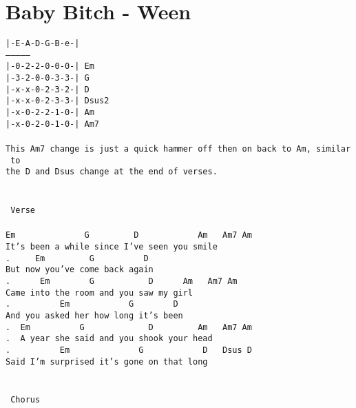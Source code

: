 \newpage
\section{Baby Bitch - Ween}
\label{Baby Bitch - Ween}
\texttt{|-E-A-D-G-B-e-|\\
---------------\\
|-0-2-2-0-0-0-|\ Em\\
|-3-2-0-0-3-3-|\ G\\
|-x-x-0-2-3-2-|\ D\\
|-x-x-0-2-3-3-|\ Dsus2\\
|-x-0-2-2-1-0-|\ Am\\
|-x-0-2-0-1-0-|\ Am7\\
\\
This\ Am7\ change\ is\ just\ a\ quick\ hammer\ off\ then\ on\ back\ to\ Am,\ similar\ to\\
the\ D\ and\ Dsus\ change\ at\ the\ end\ of\ verses.\\
\\
\\
\lbrack\ Verse\rbrack\\
\\
Em\ \ \ \ \ \ \ \ \ \ \ \ \ \ G\ \ \ \ \ \ \ \ \ D\ \ \ \ \ \ \ \ \ \ \ \ Am\ \ \ Am7\ Am\\
It's\ been\ a\ while\ since\ I've\ seen\ you\ smile\\
. \ \ \ \ Em\ \ \ \ \ \ \ \ \ G\ \ \ \ \ \ \ \ \ \ D\\
But\ now\ you've\ come\ back\ again\\
. \ \ \ \ \ Em\ \ \ \ \ \ \ \ G\ \ \ \ \ \ \ \ \ \ \ D\ \ \ \ \ \ Am\ \ \ Am7\ Am\\
Came\ into\ the\ room\ and\ you\ saw\ my\ girl\\
. \ \ \ \ \ \ \ \ \ Em\ \ \ \ \ \ \ \ \ \ \ \ G\ \ \ \ \ \ \ \ D\\
And\ you\ asked\ her\ how\ long\ it's\ been\\
. \ Em\ \ \ \ \ \ \ \ \ \ G\ \ \ \ \ \ \ \ \ \ \ \ \ D\ \ \ \ \ \ \ \ \ Am\ \ \ Am7\ Am\\
. \ A\ year\ she\ said\ and\ you\ shook\ your\ head\\
. \ \ \ \ \ \ \ \ \ Em\ \ \ \ \ \ \ \ \ \ \ \ \ \ G\ \ \ \ \ \ \ \ \ \ \ \ D\ \ \ Dsus\ D\\
Said\ I'm\ surprised\ it's\ gone\ on\ that\ long\\
\\
\\
\lbrack\ Chorus\rbrack\\
\\
}
